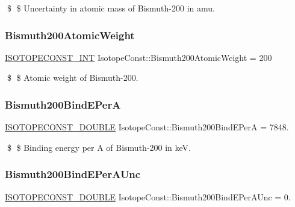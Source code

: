 \$ \$ Uncertainty in atomic mass of Bismuth-\/200 in amu. \mbox{\label{group___isotope_const-_bismuth-_bi200_gae7385dbd17a4c34d5f43d4f9b5c7e227}} 
\subsubsection{\texorpdfstring{Bismuth200\+Atomic\+Weight}{Bismuth200AtomicWeight}}
{\footnotesize\ttfamily \mbox{\hyperlink{group___isotope_const-_macros_ga5f18360b3e99483a35c32d789e62621c}{I\+S\+O\+T\+O\+P\+E\+C\+O\+N\+S\+T\+\_\+\+I\+NT}} Isotope\+Const\+::\+Bismuth200\+Atomic\+Weight = 200}

\$ \$ Atomic weight of Bismuth-\/200. \mbox{\label{group___isotope_const-_bismuth-_bi200_ga68750fccd3d4f5507af4519bb4ab6760}} 
\subsubsection{\texorpdfstring{Bismuth200\+Bind\+E\+PerA}{Bismuth200BindEPerA}}
{\footnotesize\ttfamily \mbox{\hyperlink{group___isotope_const-_macros_ga8f45a7272ce02c0b4c65c44636ed719a}{I\+S\+O\+T\+O\+P\+E\+C\+O\+N\+S\+T\+\_\+\+D\+O\+U\+B\+LE}} Isotope\+Const\+::\+Bismuth200\+Bind\+E\+PerA = 7848.}

\$ \$ Binding energy per A of Bismuth-\/200 in keV. \mbox{\label{group___isotope_const-_bismuth-_bi200_gaabe78862466557b05cd7d745cddb7a7d}} 
\subsubsection{\texorpdfstring{Bismuth200\+Bind\+E\+Per\+A\+Unc}{Bismuth200BindEPerAUnc}}
{\footnotesize\ttfamily \mbox{\hyperlink{group___isotope_const-_macros_ga8f45a7272ce02c0b4c65c44636ed719a}{I\+S\+O\+T\+O\+P\+E\+C\+O\+N\+S\+T\+\_\+\+D\+O\+U\+B\+LE}} Isotope\+Const\+::\+Bismuth200\+Bind\+E\+Per\+A\+Unc = 0.}

